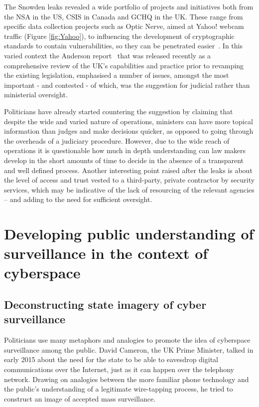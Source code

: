 \documentclass{llncs}
\begin{document}
The Snowden leaks revealed a wide portfolio of projects and initiatives both from the NSA in the US, CSIS in Canada and GCHQ in the UK. These range from specific data collection projects such as Optic Nerve, aimed at Yahoo! webcam traffic (Figure \ref{fig:Yahoo}), to influencing the development of cryptographic standards to contain vulnerabilities, so they can be penetrated easier~\cite{ECDH}. In this varied context the Anderson report~\cite{Anderson} that was released recently as a comprehensive review of the UK's capabilities and practice prior to revamping the existing legislation, emphasised a number of issues, amongst the most important - and contested - of which, was the suggestion for judicial rather than ministerial oversight.

Politicians have already started countering the suggestion by claiming that despite the wide and varied nature of operations, ministers can have more topical information than judges and make decisions quicker, as opposed to going through the overheads of a judiciary procedure. However, due to the wide reach of operations it is questionable how much in depth understanding can law makers develop in the short amounts of time to decide in the absence of a transparent and well defined process. Another interesting point raised after the leaks is about the level of access and trust vested to a third-party, private contractor by security services, which may be indicative of the lack of resourcing of the relevant agencies -- and adding to the need for sufficient oversight.

\section{Developing public understanding of surveillance in the context of cyberspace}
\label{sec:Understanding}
\subsection{Deconstructing state imagery of cyber surveillance}
Politicians use many metaphors and analogies to promote the idea of cyberspace surveillance among the public. David Cameron, the UK Prime Minister, talked in early 2015 about the need for the state to be able to eavesdrop digital communications over the Internet, just as it can happen over the telephony network. Drawing on analogies between the more familiar phone technology and the public's understanding of a legitimate wire-tapping process, he tried to construct an image of accepted mass surveillance.
\end{document}
